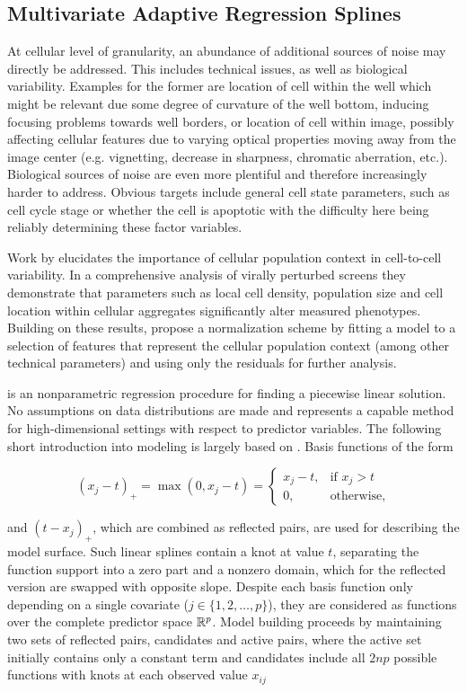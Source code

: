 \subsection{Multivariate Adaptive Regression Splines}
At cellular level of granularity, an abundance of additional sources of noise may directly be addressed. This includes technical issues, as well as biological variability. Examples for the former are location of cell within the well which might be relevant due some degree of curvature of the well bottom, inducing focusing problems towards well borders, or location of cell within image, possibly affecting cellular features due to varying optical properties moving away from the image center (e.g. vignetting, decrease in sharpness, chromatic aberration, etc.). Biological sources of noise are even more plentiful and therefore increasingly harder to address. Obvious targets include general cell state parameters, such as cell cycle stage or whether the cell is apoptotic with the difficulty here being reliably determining these factor variables.

Work by \citeauthor{Snijder2012} elucidates the importance of cellular population context in cell-to-cell variability. In a comprehensive analysis of virally perturbed  screens they demonstrate that parameters such as local cell density, population size and cell location within cellular aggregates significantly alter measured phenotypes. Building on these results, \citeauthor{Knapp2011} propose a normalization scheme by fitting a  model to a selection of features that represent the cellular population context (among other technical parameters) and using only the residuals for further analysis.

 is an nonparametric regression procedure for finding a piecewise linear solution. No assumptions on data distributions are made and  represents a capable method for high-dimensional settings with respect to predictor variables. The following short introduction into  modeling is largely based on \citet{Hastie2009}. Basis functions of the form

\begin{equation}
  (x_j-t)_+ = \max(0, x_j-t) =
  \begin{cases}
    x_j-t,& \text{if } x_j > t\\
    0,              & \text{otherwise},
  \end{cases}
\end{equation}

and $(t-x_j)_+$, which are combined as reflected pairs, are used for describing the model surface. Such linear splines contain a knot at value $t$, separating the function support into a zero part and a nonzero domain, which for the reflected version are swapped with opposite slope. Despite each basis function only depending on a single covariate ($j \in \{1, 2, \dotsc, p\}$), they are considered as functions over the complete predictor space $\mathbb{R}^p$. Model building proceeds by maintaining two sets of reflected pairs, candidates and active pairs, where the active set initially contains only a constant term and candidates include all $2np$ possible functions with knots at each observed value $x_{ij}$

